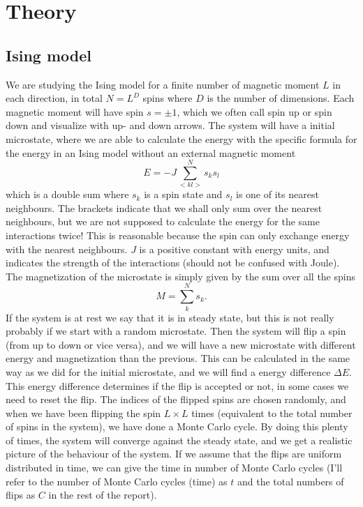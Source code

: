 \documentclass[norsk,a4paper,12pt]{article}
\begin{document}
\section{Theory}
\subsection{Ising model}
We are studying the Ising model for a finite number of magnetic moment $L$ in each direction, in total $N=L^D$ spins where $D$ is the number of dimensions. Each magnetic moment will have spin $s=\pm1$, which we often call spin up or spin down and visualize with up- and down arrows. The system will have a initial microstate, where we are able to calculate the energy with the specific formula for the energy in an Ising model without an external magnetic moment
\begin{equation}
E=-J\sum_{<kl>}^Ns_ks_l
\label{eq:Energy}
\end{equation}
which is a double sum where $s_k$ is a spin state and $s_l$ is one of its nearest neighbours. The brackets indicate that we shall only sum over the nearest neighbours, but we are not supposed to calculate the energy for the same interactions twice! This is reasonable because the spin can only exchange energy with the nearest neighbours. $J$ is a positive constant with energy units, and indicates the strength of the interactions (should not be confused with Joule). The magnetization of the microstate is simply given by the sum over all the spins
\begin{equation}
M=\sum_k^N s_k.
\label{eq:Magnetization}
\end{equation}
If the system is at rest we say that it is in steady state, but this is not really probably if we start with a random microstate. Then the system will flip a spin (from up to down or vice versa), and we will have a new microstate with different energy and magnetization than the previous. This can be calculated in the same way as we did for the initial microstate, and we will find a energy difference $\Delta E$. This energy difference determines if the flip is accepted or not, in some cases we need to reset the flip. The indices of the flipped spins are chosen randomly, and when we have been flipping the spin $L\times L$ times (equivalent to the total number of spins in the system), we have done a Monte Carlo cycle. By doing this plenty of times, the system will converge against the steady state, and we get a realistic picture of the behaviour of the system. If we assume that the flips are uniform distributed in time, we can give the time in number of Monte Carlo cycles (I'll refer to the number of Monte Carlo cycles (time) as $t$ and the total numbers of flips as $C$ in the rest of the report). 
\end{document}
